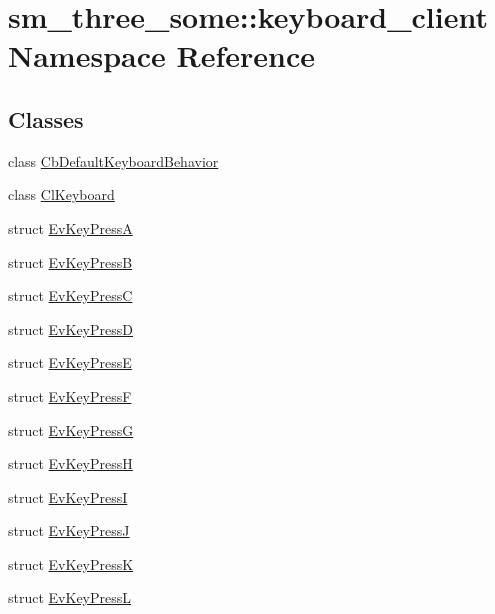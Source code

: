 \hypertarget{namespacesm__three__some_1_1keyboard__client}{}\section{sm\+\_\+three\+\_\+some\+:\+:keyboard\+\_\+client Namespace Reference}
\label{namespacesm__three__some_1_1keyboard__client}
\subsection*{Classes}
\begin{DoxyCompactItemize}
\item 
class \hyperlink{classsm__three__some_1_1keyboard__client_1_1CbDefaultKeyboardBehavior}{Cb\+Default\+Keyboard\+Behavior}
\item 
class \hyperlink{classsm__three__some_1_1keyboard__client_1_1ClKeyboard}{Cl\+Keyboard}
\item 
struct \hyperlink{structsm__three__some_1_1keyboard__client_1_1EvKeyPressA}{Ev\+Key\+PressA}
\item 
struct \hyperlink{structsm__three__some_1_1keyboard__client_1_1EvKeyPressB}{Ev\+Key\+PressB}
\item 
struct \hyperlink{structsm__three__some_1_1keyboard__client_1_1EvKeyPressC}{Ev\+Key\+PressC}
\item 
struct \hyperlink{structsm__three__some_1_1keyboard__client_1_1EvKeyPressD}{Ev\+Key\+PressD}
\item 
struct \hyperlink{structsm__three__some_1_1keyboard__client_1_1EvKeyPressE}{Ev\+Key\+PressE}
\item 
struct \hyperlink{structsm__three__some_1_1keyboard__client_1_1EvKeyPressF}{Ev\+Key\+PressF}
\item 
struct \hyperlink{structsm__three__some_1_1keyboard__client_1_1EvKeyPressG}{Ev\+Key\+PressG}
\item 
struct \hyperlink{structsm__three__some_1_1keyboard__client_1_1EvKeyPressH}{Ev\+Key\+PressH}
\item 
struct \hyperlink{structsm__three__some_1_1keyboard__client_1_1EvKeyPressI}{Ev\+Key\+PressI}
\item 
struct \hyperlink{structsm__three__some_1_1keyboard__client_1_1EvKeyPressJ}{Ev\+Key\+PressJ}
\item 
struct \hyperlink{structsm__three__some_1_1keyboard__client_1_1EvKeyPressK}{Ev\+Key\+PressK}
\item 
struct \hyperlink{structsm__three__some_1_1keyboard__client_1_1EvKeyPressL}{Ev\+Key\+PressL}

\end{DoxyCompactItemize}
